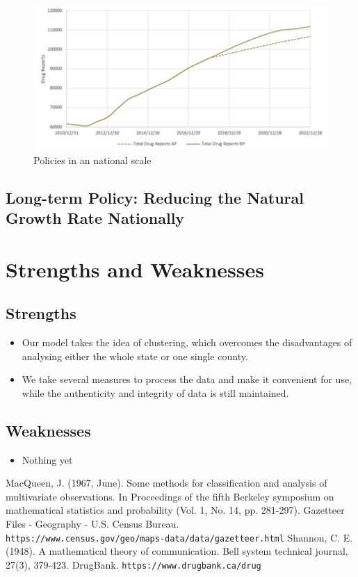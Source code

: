 \documentclass[11pt]{article}
\begin{document}
\begin{figure}[H]
	\centering
	\includegraphics[scale=0.7]{./figures/16.png}
	\caption{Policies in an national scale}
	\label{Fig16}
\end{figure}

\subsection{Long-term Policy: Reducing the Natural Growth Rate Nationally}

\section{Strengths and Weaknesses}
\subsection{Strengths}
\begin{itemize}
    \item Our model takes the idea of clustering, which overcomes the disadvantages of analysing either the whole state or one single county.
    \item We take several measures to process the data and make it convenient for use, while the authenticity and integrity of data is still maintained.
\end{itemize}

\subsection{Weaknesses}
\begin{itemize}
    \item Nothing yet
 \end{itemize}

\begin{thebibliography}{99}
MacQueen, J. (1967, June). Some methods for classification and analysis of multivariate observations. In Proceedings of the fifth Berkeley symposium on mathematical statistics and probability (Vol. 1, No. 14, pp. 281-297).
Gazetteer Files - Geography - U.S. Census Bureau. \texttt{\\https://www.census.gov/geo/maps-data/data/gazetteer.html}
Shannon, C. E. (1948). A mathematical theory of communication. Bell system technical journal, 27(3), 379-423.
DrugBank. \texttt{https://www.drugbank.ca/drug}
\end{thebibliography}
\end{document}
